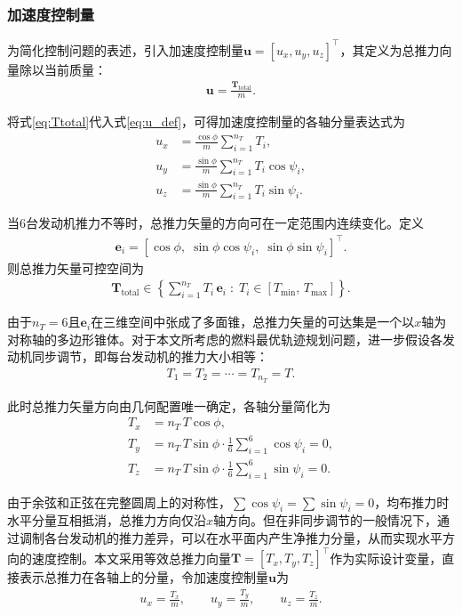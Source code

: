 \subsubsection{加速度控制量}

为简化控制问题的表述，引入加速度控制量$\bm{u} = [u_x, u_y, u_z]^{\top}$，其定义为总推力向量除以当前质量：
\begin{align}
    \bm{u} = \frac{\bm{T}_{\mathrm{total}}}{m}. \label{eq:u_def}
\end{align}

将式\eqref{eq:Ttotal}代入式\eqref{eq:u_def}，可得加速度控制量的各轴分量表达式为
\begin{align}
    u_x &= \frac{\cos\phi}{m}\sum_{i=1}^{n_T} T_i, \\
    u_y &= \frac{\sin\phi}{m}\sum_{i=1}^{n_T} T_i\cos\psi_i, \\
    u_z &= \frac{\sin\phi}{m}\sum_{i=1}^{n_T} T_i\sin\psi_i.
\end{align}

当6台发动机推力不等时，总推力矢量的方向可在一定范围内连续变化。定义
\begin{align}
    \bm{e}_i = [\cos\phi,\;\sin\phi\cos\psi_i,\;\sin\phi\sin\psi_i]^{\top}.
\end{align}
则总推力矢量可控空间为
\begin{align}
    \bm{T}_{\mathrm{total}} \in \left\{ \sum_{i=1}^{n_T} T_i\,\bm{e}_i \;:\; T_i \in [T_{\min},\, T_{\max}] \right\}.
\end{align}

由于$n_T = 6$且$\bm{e}_i$在三维空间中张成了多面锥，总推力矢量的可达集是一个以$x$轴为对称轴的多边形锥体。对于本文所考虑的燃料最优轨迹规划问题，进一步假设各发动机同步调节，即每台发动机的推力大小相等：
\begin{align}
    T_1 = T_2 = \cdots = T_{n_T} = T.
\end{align}

此时总推力矢量方向由几何配置唯一确定，各轴分量简化为
\begin{align}
    T_x &= n_T\,T\cos\phi, \\
    T_y &= n_T\,T\sin\phi\cdot\frac{1}{6}\sum_{i=1}^{6}\cos\psi_i = 0, \\
    T_z &= n_T\,T\sin\phi\cdot\frac{1}{6}\sum_{i=1}^{6}\sin\psi_i = 0.
\end{align}

由于余弦和正弦在完整圆周上的对称性，$\sum\cos\psi_i = \sum\sin\psi_i = 0$，均布推力时水平分量互相抵消，总推力方向仅沿$x$轴方向。但在非同步调节的一般情况下，通过调制各台发动机的推力差异，可以在水平面内产生净推力分量，从而实现水平方向的速度控制。本文采用等效总推力向量$\bm{T} = [T_x, T_y, T_z]^{\top}$作为实际设计变量，直接表示总推力在各轴上的分量，令加速度控制量$\bm{u}$为
\begin{align}
    u_x = \frac{T_x}{m},\qquad
    u_y = \frac{T_y}{m},\qquad
    u_z = \frac{T_z}{m}. \label{eq:u_comp}
\end{align}

